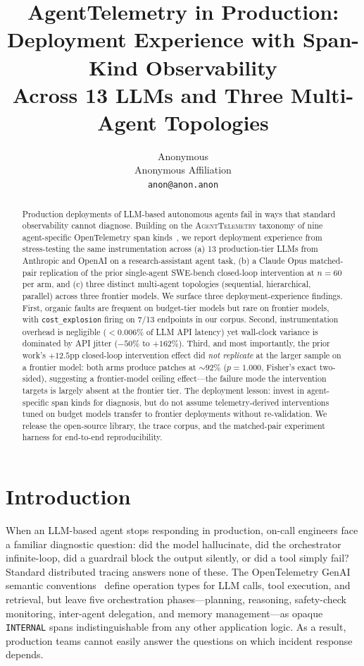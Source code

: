 \documentclass[11pt]{article}
\title{AgentTelemetry in Production:\\Deployment Experience with Span-Kind Observability\\Across 13 LLMs and Three Multi-Agent Topologies}
\author{Anonymous \\
  Anonymous Affiliation \\
  \texttt{anon@anon.anon} \\}
\begin{document}
\maketitle

\begin{abstract}
Production deployments of LLM-based autonomous agents fail in ways
that standard observability cannot diagnose. Building on the
\textsc{AgentTelemetry} taxonomy of nine agent-specific
OpenTelemetry span kinds~\citep{aiware2026}, we report deployment
experience from stress-testing the same instrumentation across (a) 13
production-tier LLMs from Anthropic and OpenAI on a research-assistant
agent task, (b) a Claude Opus matched-pair replication of the prior
single-agent SWE-bench closed-loop intervention at $n{=}60$ per arm,
and (c) three distinct multi-agent topologies (sequential,
hierarchical, parallel) across three frontier models. We surface three
deployment-experience findings. First, organic faults are frequent on
budget-tier models but rare on frontier models, with
\texttt{cost\_explosion} firing on 7/13 endpoints in our corpus.
Second, instrumentation overhead is negligible ($<$0.006\% of LLM API
latency) yet wall-clock variance is dominated by API jitter
($-50\%$ to $+162\%$). Third, and most importantly, the prior work's
$+12.5$pp closed-loop intervention effect did \emph{not replicate} at
the larger sample on a frontier model: both arms produce patches at
$\sim{}92\%$ ($p{=}1.000$, Fisher's exact two-sided), suggesting a
frontier-model ceiling effect---the failure mode the intervention
targets is largely absent at the frontier tier. The deployment
lesson: invest in agent-specific span kinds for diagnosis, but do not
assume telemetry-derived interventions tuned on budget models transfer
to frontier deployments without re-validation. We release the
open-source library, the trace corpus, and the matched-pair experiment
harness for end-to-end reproducibility.
\end{abstract}

\section{Introduction}
\label{sec:introduction}

When an LLM-based agent stops responding in production, on-call
engineers face a familiar diagnostic question: did the model
hallucinate, did the orchestrator infinite-loop, did a guardrail
block the output silently, or did a tool simply fail? Standard
distributed tracing answers none of these. The OpenTelemetry GenAI
semantic conventions~\citep{otel} define operation types for LLM
calls, tool execution, and retrieval, but leave five orchestration
phases---planning, reasoning, safety-check monitoring, inter-agent
delegation, and memory management---as opaque \texttt{INTERNAL} spans
indistinguishable from any other application logic. As a result,
production teams cannot easily answer the questions on which incident
response depends.
\end{document}
